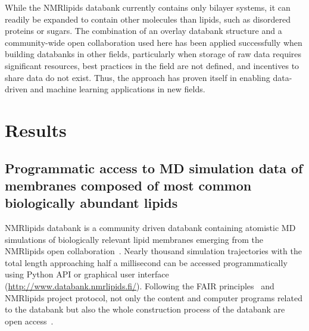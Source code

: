 \documentclass[fleqn,10pt]{wlscirep}
\begin{document}
While the NMRlipids databank currently contains only bilayer systems, it can readily be expanded to contain other molecules than lipids, such as disordered proteins or sugars. 
The combination of an overlay databank structure and a community-wide open collaboration used here has been applied successfully when building databanks in other fields,  
particularly when storage of raw data requires significant resources, best practices in the field are not defined, and incentives to share data do not exist.
Thus, the approach has proven itself in enabling data-driven and machine learning applications in new fields. 




\section{Results}

\subsection{Programmatic access to MD simulation data of membranes composed of most common biologically abundant lipids}
NMRlipids databank is a community driven databank containing atomistic MD simulations of biologically relevant lipid membranes emerging from the NMRlipids open collaboration~\cite{botan15,ollila16,catte16,antila19,bacle21}. Nearly thousand simulation trajectories with the total length approaching half a millisecond can be accessed programmatically using Python API or graphical user interface (\url{http://www.databank.nmrlipids.fi/}). 
Following the FAIR principles~\cite{wilkinson16} and NMRlipids project protocol, not only the content and computer programs related to the databank but also the whole construction process of the databank are open access~\cite{botan15}. 
\end{document}
